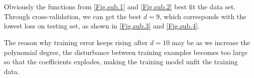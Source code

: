 \documentclass[a4paper,12pt]{article}
\begin{document}
\\
\begin{figure}[htbp]
\centering
{}
\end{figure}
\\
Obviously the functions from \ref{Fig.sub.1} and \ref{Fig.sub.2} best fit the data set. Through cross-validation, we can get the best $d = 9$, which corresponds with the lowest loss on testing set,  as shown in \ref{Fig.sub.3} and \ref{Fig.sub.4}. 

The reason why training error keeps rising after $d = 10$ may be as we increase the polynomial degree, the disturbance between training examples becomes too large so that the coefficients explodes, making the training model unfit the training data.
\\
\begin{figure}[htbp]
\centering
{}
\end{figure}
\\
\end{document}
